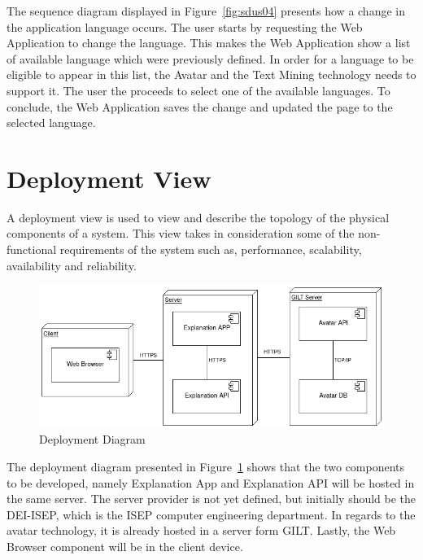 The sequence diagram displayed in Figure~\ref{fig:sdus04} presents how a change in the application language occurs.
The user starts by requesting the Web Application to change the language.
This makes the Web Application show a list of available language which were previously defined.
In order for a language to be eligible to appear in this list, the Avatar and the Text Mining technology needs to support it.
The user the proceeds to select one of the available languages.
To conclude, the Web Application saves the change and updated the page to the selected language.

\section{Deployment View}

A deployment view is used to view and describe the topology of the physical components of a system.
This view takes in consideration some of the non-functional requirements of the system such as, performance, scalability, availability and reliability.

\begin{figure}[H]
\centering
\includegraphics[width=\textwidth,keepaspectratio]{ch4/assets/deployment_diagram.png}
\caption[Deployment Diagram]{Deployment Diagram}
\label{fig:deploy}
\end{figure}

The deployment diagram presented in Figure~\ref{fig:deploy} shows that the two components to be developed, namely Explanation App and Explanation API will be hosted in the same server.
The server provider is not yet defined, but initially should be the DEI-ISEP, which is the ISEP computer engineering department.
In regards to the avatar technology, it is already hosted in a server form GILT.
Lastly, the Web Browser component will be in the client device.
